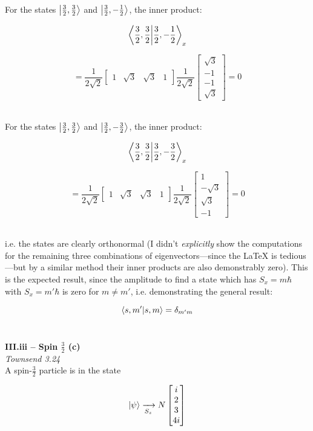 \documentclass[9pt]{extarticle}
\begin{document}
\begin{multicols*}{2}
For the states $\ket{\frac 32, \frac 32}$ and $\ket{\frac 32, -\frac 12}$, the inner product:

$$\bra{\frac 32, \frac 32}\ket{\frac 32, -\frac 12}_x$$

$$
= \frac{1}{2\sqrt 2}
\begin{bmatrix}
        1 & \sqrt 3 & \sqrt 3 & 1
\end{bmatrix}
\frac{1}{2\sqrt 2}
\begin{bmatrix}
	\sqrt 3 \\ 
	-1 \\ 
	-1 \\ 
	\sqrt 3
\end{bmatrix}
= 0
$$ \ 

For the states $\ket{\frac 32, \frac 32}$ and $\ket{\frac 32, -\frac 32}$, the inner product:

$$\bra{\frac 32, \frac 32}\ket{\frac 32, -\frac 32}_x$$

$$
= \frac{1}{2\sqrt 2}
\begin{bmatrix}
        1 & \sqrt 3 & \sqrt 3 & 1
\end{bmatrix}
\frac{1}{2\sqrt 2}
\begin{bmatrix}
        1 \\ 
        -\sqrt 3 \\
        \sqrt 3 \\ 
        -1
\end{bmatrix}
= 0
$$ \ 

i.e. the states are clearly orthonormal (I didn't {\it explicitly} show the computations for the remaining three combinations of eigenvectors---since the LaTeX is tedious---but by a similar method their inner products are also demonstrably zero). This is the expected result, since the amplitude to find a state which has $S_x = m\hbar$ with $S_x = m' \hbar$ is zero for $m \neq m'$, i.e. demonstrating the general result:

$$\bra{s,m'}\ket{s,m} = \delta_{m'm}$$ \ 





\hrulefill 

\hfill 

{\bf \LARGE III.iii -- Spin $\frac 32$ (c)} \\ 

{\it Townsend 3.24} \\ 
A spin-$\frac 32$ particle is in the state

$$
\ket{\psi} \xrightarrow[S_z]{} N
\begin{bmatrix}
	i \\ 
	2 \\ 
	3 \\ 
	4i
\end{bmatrix}
$$ \ 


\end{multicols*}
\end{document}
